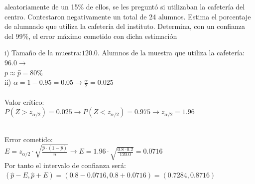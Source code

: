\documentclass[spanish, 11pt]{exam}
\begin{document}
\begin{questions}
aleatoriamente de un 15\% de ellos, se les preguntó si utilizaban la cafetería del centro. Contestaron
negativamente un total de 24 alumnos. Estima el porcentaje de alumnado que utiliza la cafetería del instituto.
Determina, con un confianza del 99\%, el error máximo cometido con dicha estimación \begin{solution}   i) Tamaño de la muestra:$120.0$. Alumnos de la muestra que utiliza la cafetería: $96.0\to $ \\ $p \approx \widehat{p} =80$\% \\ ii) $\alpha=1-0.95=0.05\to \frac{\alpha}{2}=0.025$ \\ \\ Valor crítico: \\ $P(Z>z_{\alpha/2})=0.025\to P(Z<z_{\alpha/2})=0.975 \to z_{\alpha/2} =1.96$ \\ 
   \\
  Error cometido: \\ $E=z_{\alpha / 2}\cdot \sqrt{\frac{\widehat{p}\cdot\left(1-\widehat{p} \right)}{n}} \to E=1.96\cdot \sqrt{\frac{0.8\cdot0.2}{120.0}}=0.0716$ \\ Por tanto el intervalo de confianza será: \\$\left(\widehat{p} - E , \widehat{p} + E \right)=\left(0.8 - 0.0716 , 0.8 + 0.0716 \right)=\left(0.7284, 0.8716 \right)$ \\  \\ 
\end{solution}
\end{questions}
\end{document}
